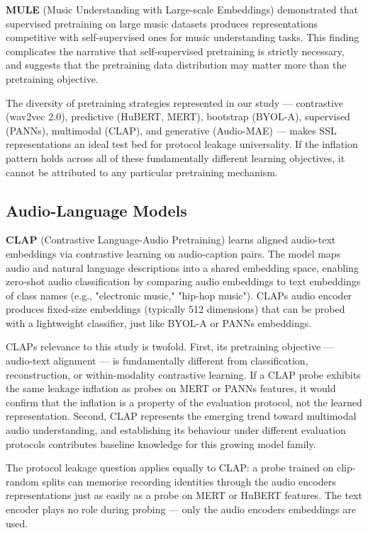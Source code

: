 \documentclass[conference]{IEEEtran}
\begin{document}
\textbf{MULE} (Music Understanding with Large-scale Embeddings)
\citep{mccallum2022mule} demonstrated that supervised pretraining on
large music datasets produces representations competitive with
self-supervised ones for music understanding tasks. This finding
complicates the narrative that self-supervised pretraining is strictly
necessary, and suggests that the pretraining data distribution may
matter more than the pretraining objective.

The diversity of pretraining strategies represented in our study ---
contrastive (wav2vec 2.0), predictive (HuBERT, MERT), bootstrap
(BYOL-A), supervised (PANNs), multimodal (CLAP), and generative
(Audio-MAE) --- makes SSL representations an ideal test bed for
protocol leakage universality. If the inflation pattern holds across all
of these fundamentally different learning objectives, it cannot be
attributed to any particular pretraining mechanism.

\subsection{Audio-Language Models}\label{c.-audio-language-models}

\textbf{CLAP} (Contrastive Language-Audio Pretraining)
\citep{wu2023clap, elizalde2023clap} learns aligned audio-text
embeddings via contrastive learning on audio-caption pairs. The model
maps audio and natural language descriptions into a shared embedding
space, enabling zero-shot audio classification by comparing audio
embeddings to text embeddings of class names (e.g., "electronic music,"
"hip-hop music"). CLAP\textquotesingle s audio encoder produces
fixed-size embeddings (typically 512 dimensions) that can be probed with
a lightweight classifier, just like BYOL-A or PANNs embeddings.

CLAP\textquotesingle s relevance to this study is twofold. First, its
pretraining objective --- audio-text alignment --- is
fundamentally different from classification, reconstruction, or
within-modality contrastive learning. If a CLAP probe exhibits the same
leakage inflation as probes on MERT or PANNs features, it would confirm
that the inflation is a property of the evaluation protocol, not the
learned representation. Second, CLAP represents the emerging trend
toward multimodal audio understanding, and establishing its behaviour
under different evaluation protocols contributes baseline knowledge for
this growing model family.

The protocol leakage question applies equally to CLAP: a probe trained
on clip-random splits can memorise recording identities through the
audio encoder\textquotesingle s representations just as easily as a
probe on MERT or HuBERT features. The text encoder plays no role during
probing --- only the audio encoder\textquotesingle s embeddings are
used.
\end{document}
